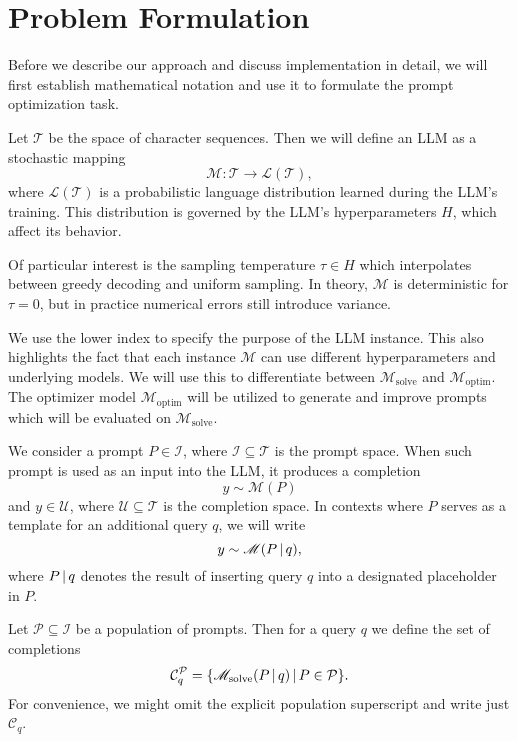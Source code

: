 \section{Problem Formulation}\label{sec:notation}
Before we describe our approach and discuss implementation in detail, we will first establish mathematical notation and use it to 
formulate the prompt optimization task.

Let $\mathcal{T}$ be the space of character sequences. Then we will define an LLM as a stochastic mapping
\begin{equation}
    \mathscr{M}: \mathcal{T} \rightarrow \mathcal{L}(\mathcal{T}),
\end{equation}
where $\mathcal{L}(\mathcal{T})$ is a probabilistic language distribution learned during the LLM's training.
This distribution is governed by the LLM's hyperparameters $H$, which affect its behavior. 

Of particular interest is the sampling temperature $\tau \in H$ which interpolates between greedy decoding and uniform sampling.
In theory, $\mathscr{M}$ is deterministic for $\tau=0$, but in practice numerical errors still introduce variance.

We use the lower index to specify the purpose of the LLM instance. This also highlights
the fact that each instance $\mathscr{M}$ can use different hyperparameters and underlying models. 
We will use this to differentiate between $\mathscr{M}_{\text{solve}}$ and $\mathscr{M}_{\text{optim}}$.
The optimizer model $\mathscr{M}_{\text{optim}}$ will be utilized to generate and improve prompts which will be evaluated on $\mathscr{M}_{\text{solve}}$.


We consider a prompt $P \in \mathcal{I}$, where $\mathcal{I} \subseteq \mathcal{T}$ is the prompt space.
When such prompt is used as an input into the LLM, it produces a completion
\begin{equation}
    y \sim \mathscr{M}(P)
\end{equation}
and $y \in \mathcal{U}$, where
$\mathcal{U} \subseteq \mathcal{T}$ is the completion space.
In contexts where $P$ serves as a template for an additional query $q$, we will write
\begin{equation}
    y \sim \mathscr{M}(P\, \vert \, q),
\end{equation}
where $P \, \vert \, q$ denotes the result of inserting query $q$ into a designated placeholder in $P$.

Let $\mathcal{P} \subseteq \mathcal{I}$ be a population of prompts. Then for a query $q$ we define the set of completions 
\begin{equation}
    \mathcal{C}_{q}^{\mathcal{P}} = \{\mathscr{M}_{\text{solve}}(P\, \vert \, q)\, \vert \, P \in \mathcal{P}\}.
\end{equation}
For convenience, we might omit the explicit population superscript and write just $ \mathcal{C}_{q}$.


